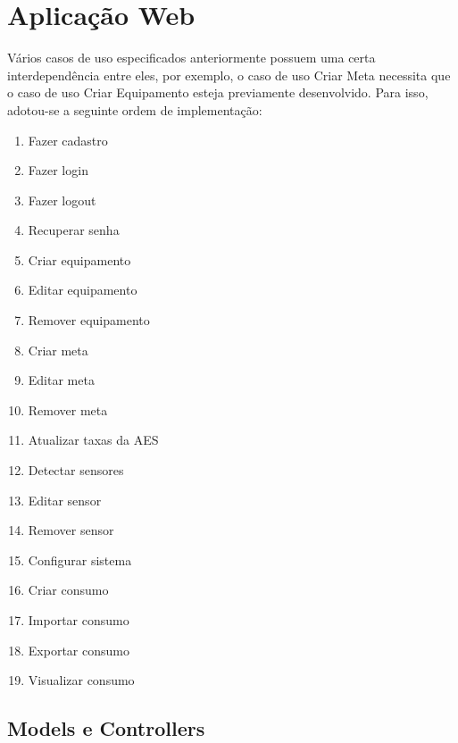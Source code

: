 \section{Aplicação Web}
\label{Sec:5-aplicativo-web}

Vários casos de uso especificados anteriormente possuem uma certa interdependência entre eles, por exemplo, o caso de uso Criar Meta necessita que o caso de uso Criar Equipamento esteja previamente desenvolvido. Para isso, adotou-se a seguinte ordem de implementação:

\begin{enumerate}
	\item{Fazer cadastro}
	\item{Fazer login}
	\item{Fazer logout}
	\item{Recuperar senha}
	\item{Criar equipamento}
	\item{Editar equipamento}
	\item{Remover equipamento}
	\item{Criar meta}
	\item{Editar meta}
	\item{Remover meta}
	\item{Atualizar taxas da AES}
	\item{Detectar sensores}
	\item{Editar sensor}
	\item{Remover sensor}
	\item{Configurar sistema}
	\item{Criar consumo}
	\item{Importar consumo}
	\item{Exportar consumo}
	\item{Visualizar consumo}
\end{enumerate}

\subsection{Models e Controllers}


